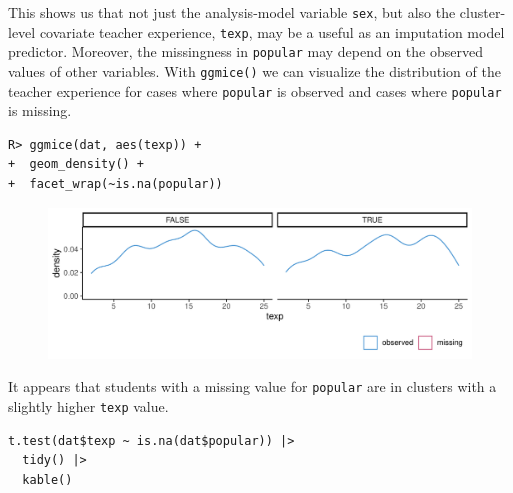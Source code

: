 \documentclass[
  article]{jss}
\begin{document}
This shows us that not just the analysis-model variable \texttt{sex},
but also the cluster-level covariate teacher experience, \texttt{texp},
may be a useful as an imputation model predictor. Moreover, the
missingness in \texttt{popular} may depend on the observed values of
other variables. With \texttt{ggmice()} we can visualize the
distribution of the teacher experience for cases where \texttt{popular}
is observed and cases where \texttt{popular} is missing.

\begin{verbatim}
R> ggmice(dat, aes(texp)) + 
+  geom_density() +
+  facet_wrap(~is.na(popular))
\end{verbatim}

\begin{figure}[h]

{\centering \includegraphics{manuscript_files/figure-pdf/unnamed-chunk-11-1.pdf}

}

\end{figure}

It appears that students with a missing value for \texttt{popular} are
in clusters with a slightly higher \texttt{texp} value.

\begin{verbatim}
t.test(dat$texp ~ is.na(dat$popular)) |> 
  tidy() |>
  kable()
\end{verbatim}
\end{document}
